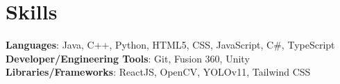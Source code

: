 \documentclass[letterpaper,11pt]{article}
\begin{document}
\section{Skills}
\begin{itemize}[leftmargin=0.15in, label={}]
   \small{\item{   
    \textbf{Languages}{: Java, C++, Python, HTML5, CSS, JavaScript, C\#, TypeScript} \\[1mm]
    \textbf{Developer/Engineering Tools}{: Git, Fusion 360, Unity} \\[1mm]
    \textbf{Libraries/Frameworks}{: ReactJS, OpenCV, YOLOv11, Tailwind CSS} \\ [1mm]
   }}
\end{itemize}
\vspace{-16pt}
\vspace{3pt}
\vspace{10pt}

\vspace{-12pt}
\end{document}
